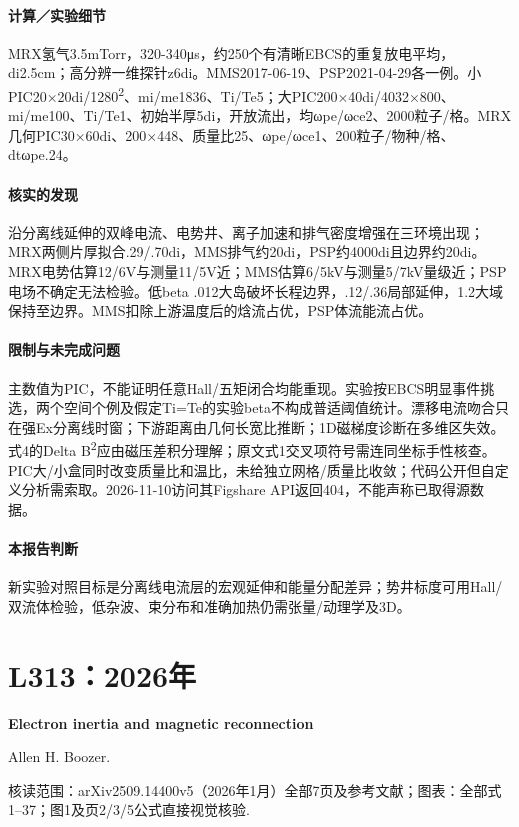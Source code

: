\documentclass[UTF8,a4paper,11pt,openany,fontset=fandol]{ctexbook}
\begin{document}
\paragraph{计算／实验细节}MRX氢气3.5mTorr，320-340μs，约250个有清晰EBCS的重复放电平均，di2.5cm；高分辨一维探针z6di。MMS2017-06-19、PSP2021-04-29各一例。小PIC20×20di/1280\textsuperscript{2}、mi/me1836、Ti/Te5；大PIC200×40di/4032×800、mi/me100、Ti/Te1、初始半厚5di，开放流出，均ωpe/ωce2、2000粒子/格。MRX几何PIC30×60di、200×448、质量比25、ωpe/ωce1、200粒子/物种/格、dtωpe.24。

\paragraph{核实的发现}沿分离线延伸的双峰电流、电势井、离子加速和排气密度增强在三环境出现；MRX两侧片厚拟合.29/.70di，MMS排气约20di，PSP约4000di且边界约20di。MRX电势估算12/6V与测量11/5V近；MMS估算6/5kV与测量5/7kV量级近；PSP电场不确定无法检验。低beta .012大岛破坏长程边界，.12/.36局部延伸，1.2大域保持至边界。MMS扣除上游温度后的焓流占优，PSP体流能流占优。

\paragraph{限制与未完成问题}主数值为PIC，不能证明任意Hall/五矩闭合均能重现。实验按EBCS明显事件挑选，两个空间个例及假定Ti=Te的实验beta不构成普适阈值统计。漂移电流吻合只在强Ex分离线时窗；下游距离由几何长宽比推断；1D磁梯度诊断在多维区失效。式4的Delta B\textsuperscript{2}应由磁压差积分理解；原文式1交叉项符号需连同坐标手性核查。PIC大/小盒同时改变质量比和温比，未给独立网格/质量比收敛；代码公开但自定义分析需索取。2026-11-10访问其Figshare API返回404，不能声称已取得源数据。

\paragraph{本报告判断}新实验对照目标是分离线电流层的宏观延伸和能量分配差异；势井标度可用Hall/双流体检验，低杂波、束分布和准确加热仍需张量/动理学及3D。

\section{L313：2026年}\label{paper:L313}

\textbf{Electron inertia and magnetic reconnection}\citep{L313}\

Allen H. Boozer.

\textsf{核读范围：}arXiv2509.14400v5（2026年1月）全部7页及参考文献；\textsf{图表：}全部式1–37；图1及页2/3/5公式直接视觉核验.
\end{document}
